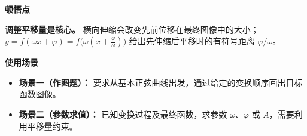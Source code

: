\begin{explanationbox}
	\medskip
	\textbf{\textcolor{CExplanation}{顿悟点}}

	\textbf{调整平移量是核心。} 横向伸缩会改变先前位移在最终图像中的大小；$y=f(\omega x+\varphi)=f\big(\omega(x+\frac{\varphi}{\omega})\big)$ 给出先伸缩后平移时的有符号距离 $\varphi/\omega$。

	\medskip
	\textbf{\textcolor{CExplanation}{使用场景}}
	\begin{itemize}[leftmargin=*, itemsep=0.5em, topsep=0.4em]
		\item \textbf{场景一（作图题）：} 要求从基本正弦曲线出发，通过给定的变换顺序画出目标函数图像。
		\item \textbf{场景二（参数求值）：} 已知变换过程及最终函数，求参数 $\omega$、$\varphi$ 或 $A$，需要利用平移量约束。
	\end{itemize}
\end{explanationbox}
